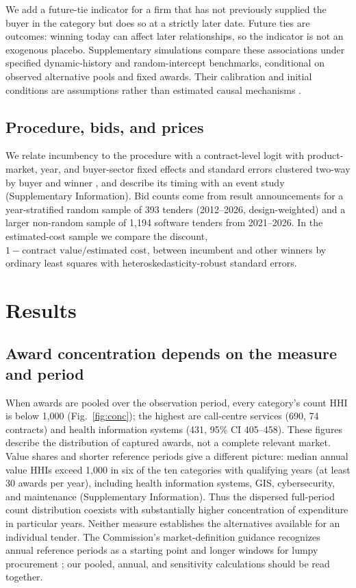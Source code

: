\documentclass[pdflatex,sn-apa]{sn-jnl}
\begin{document}
We add a future-tie indicator for a firm that has not previously supplied the buyer in the category but does so at a strictly later date. Future ties are outcomes: winning today can affect later relationships, so the indicator is not an exogenous placebo. Supplementary simulations compare these associations under specified dynamic-history and random-intercept benchmarks, conditional on observed alternative pools and fixed awards. Their calibration and initial conditions are assumptions rather than estimated causal mechanisms \citep{Wooldridge2005,Train2009}.

\subsection{Procedure, bids, and prices}
We relate incumbency to the procedure with a contract-level logit with product-market, year, and buyer-sector fixed effects and standard errors clustered two-way by buyer and winner \citep{Cameron2011}, and describe its timing with an event study (Supplementary Information). Bid counts come from result announcements for a year-stratified random sample of 393 tenders (2012--2026, design-weighted) and a larger non-random sample of 1,194 software tenders from 2021--2026. In the estimated-cost sample we compare the discount, $1-\text{contract value}/\text{estimated cost}$, between incumbent and other winners by ordinary least squares with heteroskedasticity-robust standard errors.

\section{Results}\label{sec:results}

\subsection{Award concentration depends on the measure and period}
When awards are pooled over the observation period, every category's count HHI is below 1,000 (Fig.~\ref{fig:conc}); the highest are call-centre services (690, 74 contracts) and health information systems (431, 95\% CI 405--458). These figures describe the distribution of captured awards, not a complete relevant market. Value shares and shorter reference periods give a different picture: median annual value HHIs exceed 1,000 in six of the ten categories with qualifying years (at least 30 awards per year), including health information systems, GIS, cybersecurity, and maintenance (Supplementary Information). Thus the dispersed full-period count distribution coexists with substantially higher concentration of expenditure in particular years. Neither measure establishes the alternatives available for an individual tender. The Commission's market-definition guidance recognizes annual reference periods as a starting point and longer windows for lumpy procurement \citep{ECMarketDefinition2024}; our pooled, annual, and sensitivity calculations should be read together.
\end{document}
